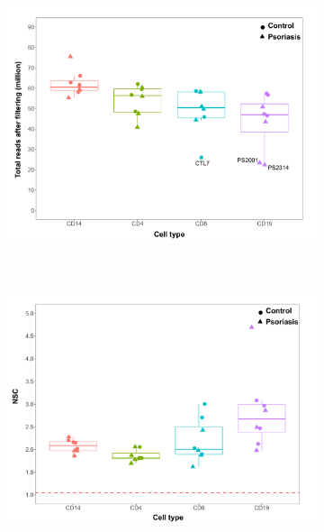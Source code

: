 \begin{figure}[htbp]
\centering
\begin{subfigure}{0.5\textwidth}
\centering
\includegraphics[width=\textwidth]{./Results2/pdfs/ChIPm_PS_CTL_final_filtered_reads_boxplot}
\caption{\textbf{}}
\end{subfigure} \\
\begin{subfigure}{0.5\textwidth}
\centering
\includegraphics[width=\textwidth]{./Results2/pdfs/ChIPm_PS_CTL_NSC_boxplot}
\caption{\textbf{}}
\end{subfigure}%
\begin{subfigure}{0.5\textwidth}

\end{subfigure}
\end{figure}
